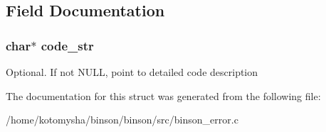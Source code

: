 \subsection{Field Documentation}
\hypertarget{structbinson__error__rec___a9dc1fc9223483a5bdb7a8a8d02652c5d}{
\subsubsection[{code\-\_\-str}]{\setlength{\rightskip}{0pt plus 5cm}char$\ast$ code\-\_\-str}}\label{structbinson__error__rec___a9dc1fc9223483a5bdb7a8a8d02652c5d}
Optional. If not N\-U\-L\-L, point to detailed code description 

The documentation for this struct was generated from the following file\-:\begin{DoxyCompactItemize}
\item 
/home/kotomysha/binson/binson/src/binson\-\_\-error.\-c\end{DoxyCompactItemize}
